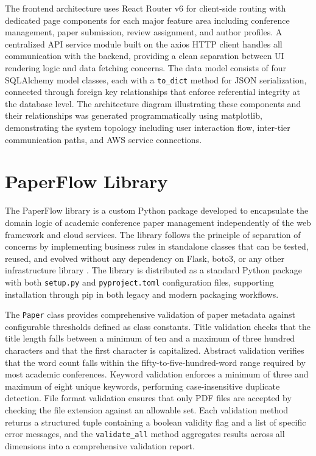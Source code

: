 \documentclass[conference]{IEEEtran}
\begin{document}
The frontend architecture uses React Router v6 for client-side routing with dedicated page components for each major feature area including conference management, paper submission, review assignment, and author profiles. A centralized API service module built on the axios HTTP client handles all communication with the backend, providing a clean separation between UI rendering logic and data fetching concerns. The data model consists of four SQLAlchemy model classes, each with a \texttt{to\_dict} method for JSON serialization, connected through foreign key relationships that enforce referential integrity at the database level. The architecture diagram illustrating these components and their relationships was generated programmatically using matplotlib, demonstrating the system topology including user interaction flow, inter-tier communication paths, and AWS service connections.

\section{PaperFlow Library}

The PaperFlow library is a custom Python package developed to encapsulate the domain logic of academic conference paper management independently of the web framework and cloud services. The library follows the principle of separation of concerns by implementing business rules in standalone classes that can be tested, reused, and evolved without any dependency on Flask, boto3, or any other infrastructure library \cite{fowler2018}. The library is distributed as a standard Python package with both \texttt{setup.py} and \texttt{pyproject.toml} configuration files, supporting installation through pip in both legacy and modern packaging workflows.

The \texttt{Paper} class provides comprehensive validation of paper metadata against configurable thresholds defined as class constants. Title validation checks that the title length falls between a minimum of ten and a maximum of three hundred characters and that the first character is capitalized. Abstract validation verifies that the word count falls within the fifty-to-five-hundred-word range required by most academic conferences. Keyword validation enforces a minimum of three and maximum of eight unique keywords, performing case-insensitive duplicate detection. File format validation ensures that only PDF files are accepted by checking the file extension against an allowable set. Each validation method returns a structured tuple containing a boolean validity flag and a list of specific error messages, and the \texttt{validate\_all} method aggregates results across all dimensions into a comprehensive validation report.
\end{document}
